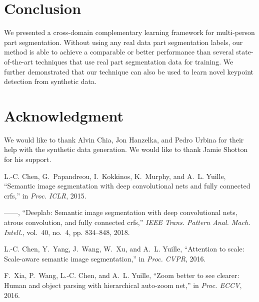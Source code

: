 \documentclass[final]{IEEEtran}
\begin{document}
{\begin{minipage}{\textwidth}
\section{Conclusion}\label{sec:conclusion}
We presented a cross-domain complementary learning framework for multi-person part segmentation. Without using any real data part segmentation labels, our method is able to achieve a comparable or better performance than several state-of-the-art techniques that use real part segmentation data for training. We further demonstrated that our technique can also be used to learn novel keypoint detection from synthetic data.











\section*{Acknowledgment}

We would like to thank Alvin Chia, Jon Hanzelka, and Pedro Urbina for their help with the synthetic data generation. We would like to thank Jamie Shotton for his support.


\ifCLASSOPTIONcaptionsoff
  \newpage
\fi











\begin{thebibliography}{1}

L.-C. Chen, G.~Papandreou, I.~Kokkinos, K.~Murphy, and A.~L. Yuille, ``Semantic
  image segmentation with deep convolutional nets and fully connected crfs,''
  in \emph{Proc. ICLR}, 2015.

------, ``Deeplab: Semantic image segmentation with deep convolutional nets,
  atrous convolution, and fully connected crfs,'' \emph{IEEE Trans. Pattern
  Anal. Mach. Intell.}, vol.~40, no.~4, pp. 834--848, 2018.

L.-C. Chen, Y.~Yang, J.~Wang, W.~Xu, and A.~L. Yuille, ``Attention to scale:
  Scale-aware semantic image segmentation,'' in \emph{Proc. CVPR}, 2016.

F.~Xia, P.~Wang, L.-C. Chen, and A.~L. Yuille, ``Zoom better to see clearer:
  Human and object parsing with hierarchical auto-zoom net,'' in \emph{Proc.
  ECCV}, 2016.


\end{thebibliography}
\end{minipage}}
\end{document}
